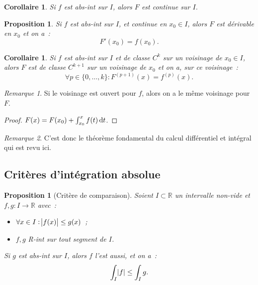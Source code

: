 \documentclass{report}
\newtheorem{prp}[thm]{Proposition}
\newtheorem{cor}[thm]{Corollaire}
\theoremstyle{definition}
\theoremstyle{remark}
\newtheorem*{rmq}{Remarque}
\numberwithin{equation}{section}
\newcommand{\R}{\mathbb R}
\begin{document}
			\begin{cor} Si $f$ est abs-int sur $I$, alors $F$ est continue sur $I$.
			\end{cor}

			\begin{prp} Si $f$ est abs-int sur $I$, et continue en $x_0 \in I$, alors $F$ est dérivable en $x_0$ et on a~:
			\begin{equation}
				F'(x_0) = f(x_0).
			\end{equation}
			\end{prp}

			\begin{cor} Si $f$ est abs-int sur $I$ et de classe $C^k$ sur un voisinage de $x_0 \in I$, alors $F$ est de classe $C^{k+1}$ sur un voisinage de
			$x_0$ et on a, sur ce voisinage~:
			\begin{equation}
				\forall p \in \{0, \ldots, k\} : F^{(p+1)}(x) = f^{(p)}(x).
			\end{equation}
			\end{cor}

			\begin{rmq} Si le voisinage est ouvert pour $f$, alors on a le même voisinage pour $F$.
			\end{rmq}

			\begin{proof} $F(x) = F(x_0) + \int_{x_0}^x f(t)\dif t$.
			\end{proof}

			\begin{rmq} C'est donc le théorème fondamental du calcul différentiel et intégral qui est revu ici.
			\end{rmq}

		\subsection{Critères d'intégration absolue}
			\begin{prp}[Critère de comparaison]\label{prp:critèredecomparaison} Soient $I \subset \R$ un intervalle non-vide et $f, g : I \to \R$ avec~:
			\begin{itemize}
				\item $\forall x \in I : \abs {f(x)} \leq g(x)$~;
				\item $f, g$ R-int sur tout segment de $I$.
			\end{itemize}

			Si $g$ est abs-int sur $I$, alors $f$ l'est aussi, et on a~:
			\begin{equation}
				\int_I\abs f \leq \int_I g.
			\end{equation}
			\end{prp}
\end{document}

